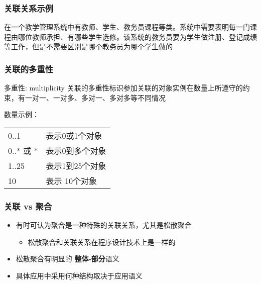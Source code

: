 \documentclass[compress]{beamer}
\begin{document}
\begin{frame}
\frametitle{关联关系示例}
\begin{example}
在一个教学管理系统中有教师、学生、教务员课程等类。系统中需要表明每一门课程由哪位教师承担、有哪些学生选修。该系统的教务员要为学生做注册、登记成绩等工作，但是不需要区别是哪个教务员为哪个学生做的 
\end{example}

\vspace*{2ex}


\end{frame}

\begin{frame}
\frametitle{关联的多重性}
\begin{block}{多重性: multiplicity}
关联的多重性标识参加关联的对象实例在数量上所遵守的约束，有一对一、一对多、多对一、多对多等不同情况
\end{block}
数量示例： \\
\begin{tabular}{ll}
0..1 & 表示0或1个对象 \\
0..* 或 * & 表示0到多个对象 \\
1..25 & 表示1到25个对象 \\
10 & 表示 10个对象
\end{tabular}
\end{frame}

\begin{frame}
\frametitle{关联 vs 聚合}
\begin{itemize}
  \item 有时可认为聚合是一种特殊的关联关系，尤其是松散聚合
    \begin{itemize}
      \item 松散聚合和关联关系在程序设计技术上是一样的
    \end{itemize}
  \item 松散聚合有明显的 \textbf{整体-部分}语义
  \item 具体应用中采用何种结构取决于应用语义
\end{itemize}
\end{frame}
\end{document}
